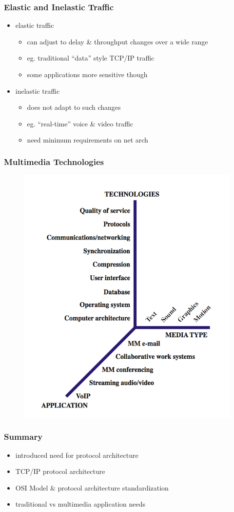 \documentclass[pdflatex,compress]{beamer}
\begin{document}
\begin{frame}
	\frametitle{Elastic and Inelastic Traffic}
	\begin{itemize}
		\item elastic traffic
		\begin{itemize}
			\item can adjust to delay \& throughput changes over a wide range
			\item eg. traditional “data” style TCP/IP traffic
			\item some applications more sensitive though
		\end{itemize}
		\item inelastic traffic
		\begin{itemize}
			\item does not adapt to such changes
			\item eg. “real-time” voice \& video traffic
			\item need minimum requirements on net arch
		\end{itemize}
	\end{itemize}
\end{frame}

\begin{frame}
	\frametitle{Multimedia Technologies}
	\begin{figure}
		\centering
		\includegraphics[height=0.9\textheight]{img/img13}
	\end{figure}
\end{frame}

\begin{frame}
	\frametitle{Summary}
	\begin{itemize}
		\item introduced need for protocol architecture
		\item TCP/IP protocol architecture
		\item OSI Model \& protocol architecture standardization
		\item traditional vs multimedia application needs
	\end{itemize}
\end{frame}
\end{document}
